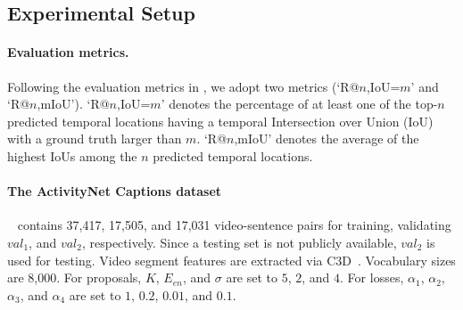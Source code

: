 


\subsection{Experimental Setup}
\label{sec:experimental-setup}

\paragraph{Evaluation metrics.} Following the evaluation metrics in \cite{gao2017tall}, we adopt two metrics (`R@$n$,IoU=$m$' and `R@$n$,mIoU').
`R@$n$,IoU=$m$' denotes the percentage of at least one of the top-$n$ predicted temporal locations having a temporal Intersection over Union (IoU) with a ground truth larger than $m$.
`R@$n$,mIoU' denotes the average of the highest IoUs among the $n$ predicted temporal locations.



\paragraph{The ActivityNet Captions dataset}~\cite{krishna2017dense}
contains 37,417, 17,505, and 17,031 video-sentence pairs for training, validating $val_1$, and $val_2$, respectively.
Since a testing set is not publicly available, $val_2$ is used for testing.
Video segment features are extracted via C3D~\cite{tran2015learning}.
Vocabulary sizes are 8,000.
For proposals, $K$, $E_{en}$, and $\sigma$ are set to $5$, $2$, and $4$.
For losses, $\alpha_1$, $\alpha_2$, $\alpha_3$, and $\alpha_4$ are set to $1$, $0.2$, $0.01$, and $0.1$.

